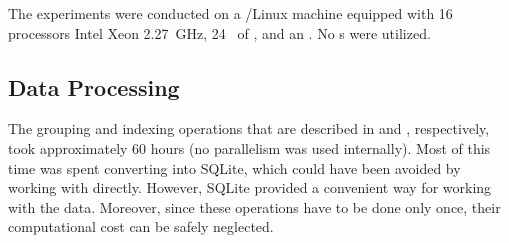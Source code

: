 The experiments were conducted on a /Linux machine equipped with 16
processors Intel Xeon  2.27~GHz, 24~ of , and an
. No s were utilized.

\subsection{Data Processing}
The grouping and indexing operations that are described in  and
, respectively, took approximately 60 hours (no parallelism was
used internally). Most of this time was spent converting  into SQLite,
which could have been avoided by working with  directly. However, SQLite
provided a convenient way for working with the data. Moreover, since these
operations have to be done only once, their computational cost can be safely
neglected.
